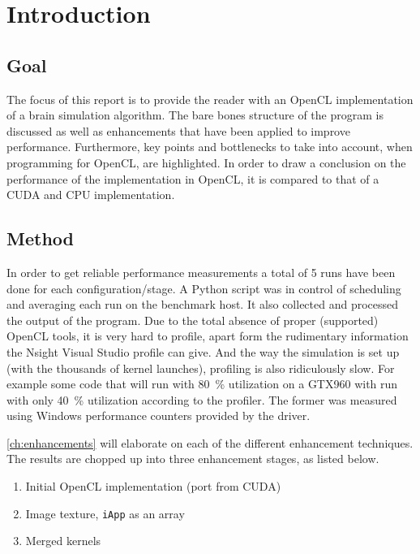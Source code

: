 \documentclass[final]{report}
\begin{document}
\chapter{Introduction}

\section{Goal}
The focus of this report is to provide the reader with an OpenCL implementation of a brain simulation algorithm.
The bare bones structure of the program is discussed as well as enhancements that have been applied to improve performance.
Furthermore, key points and bottlenecks to take into account, when programming for OpenCL, are highlighted. 
In order to draw a conclusion on the performance of the implementation in OpenCL, it is compared to that of a CUDA and CPU implementation.

\section{Method}
In order to get reliable performance measurements a total of 5 runs have been done for each configuration/stage.
A Python script was in control of scheduling and averaging each run on the benchmark host.
It also collected and processed the output of the program.
Due to the total absence of proper (supported) OpenCL tools, it is very hard to profile, apart form the rudimentary information the Nsight Visual Studio profile can give.
And the way the simulation is set up (with the thousands of kernel launches), profiling is also ridiculously slow.
For example some code that will run with \SI{80}{\percent} utilization on a GTX960 with run with only \SI{40}{\percent} utilization according to the profiler.
The former was measured using Windows performance counters provided by the driver.

\cref{ch:enhancements} will elaborate on each of the different enhancement techniques.
The results are chopped up into three enhancement stages, as listed below.
\begin{enumerate}
	\item Initial OpenCL implementation (port from CUDA)
	\item Image texture, \texttt{iApp} as an array
	\item Merged kernels
\end{enumerate}

\end{document}
